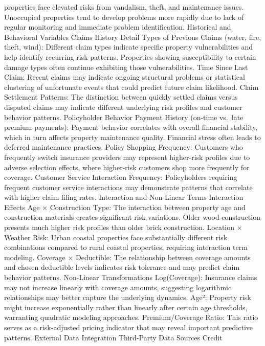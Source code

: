 \documentclass[8pt, twocolumn]{extarticle}
\begin{document}
properties face elevated risks from vandalism, theft, and maintenance
issues. Unoccupied properties tend to develop problems more rapidly due
to lack of regular monitoring and immediate problem identification.
Historical and Behavioral Variables Claims History Detail Types of
Previous Claims (water, fire, theft, wind): Different claim types
indicate specific property vulnerabilities and help identify recurring
risk patterns. Properties showing susceptibility to certain damage types
often continue exhibiting those vulnerabilities. Time Since Last Claim:
Recent claims may indicate ongoing structural problems or statistical
clustering of unfortunate events that could predict future claim
likelihood. Claim Settlement Patterns: The distinction between quickly
settled claims versus disputed claims may indicate different underlying
risk profiles and customer behavior patterns. Policyholder Behavior
Payment History (on-time vs.~late premium payments): Payment behavior
correlates with overall financial stability, which in turn affects
property maintenance quality. Financial stress often leads to deferred
maintenance practices. Policy Shopping Frequency: Customers who
frequently switch insurance providers may represent higher-risk profiles
due to adverse selection effects, where higher-risk customers shop more
frequently for coverage. Customer Service Interaction Frequency:
Policyholders requiring frequent customer service interactions may
demonstrate patterns that correlate with higher claim filing rates.
Interaction and Non-Linear Terms Interaction Effects Age × Construction
Type: The interaction between property age and construction materials
creates significant risk variations. Older wood construction presents
much higher risk profiles than older brick construction. Location ×
Weather Risk: Urban coastal properties face substantially different risk
combinations compared to rural coastal properties, requiring interaction
term modeling. Coverage × Deductible: The relationship between coverage
amounts and chosen deductible levels indicates risk tolerance and may
predict claim behavior patterns. Non-Linear Transformations
Log(Coverage): Insurance claims may not increase linearly with coverage
amounts, suggesting logarithmic relationships may better capture the
underlying dynamics. Age²: Property risk might increase exponentially
rather than linearly after certain age thresholds, warranting quadratic
modeling approaches. Premium/Coverage Ratio: This ratio serves as a
risk-adjusted pricing indicator that may reveal important predictive
patterns. External Data Integration Third-Party Data Sources Credit
\end{document}
